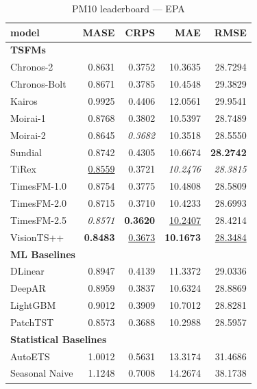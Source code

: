 \begin{table}[H]
\caption{PM10 leaderboard --- EPA}
\centering
\begin{small}
\begin{tabular}{lrrrr}
\toprule
model & MASE & CRPS & MAE & RMSE \\
\midrule
\multicolumn{5}{l}{\textbf{TSFMs}} \\
Chronos-2 & 0.8631 & 0.3752 & 10.3635 & 28.7294 \\
Chronos-Bolt & 0.8671 & 0.3785 & 10.4548 & 29.3829 \\
Kairos & 0.9925 & 0.4406 & 12.0561 & 29.9541 \\
Moirai-1 & 0.8768 & 0.3802 & 10.5397 & 28.7489 \\
Moirai-2 & 0.8645 & \textit{0.3682} & 10.3518 & 28.5550 \\
Sundial & 0.8742 & 0.4305 & 10.6674 & \textbf{28.2742} \\
TiRex & \underline{0.8559} & 0.3721 & \textit{10.2476} & \textit{28.3815} \\
TimesFM-1.0 & 0.8754 & 0.3775 & 10.4808 & 28.5809 \\
TimesFM-2.0 & 0.8715 & 0.3710 & 10.4233 & 28.6993 \\
TimesFM-2.5 & \textit{0.8571} & \textbf{0.3620} & \underline{10.2407} & 28.4214 \\
VisionTS++ & \textbf{0.8483} & \underline{0.3673} & \textbf{10.1673} & \underline{28.3484} \\
\midrule
\multicolumn{5}{l}{\textbf{ML Baselines}} \\
DLinear & 0.8947 & 0.4139 & 11.3372 & 29.0336 \\
DeepAR & 0.8959 & 0.3837 & 10.6324 & 28.8869 \\
LightGBM & 0.9012 & 0.3909 & 10.7012 & 28.8281 \\
PatchTST & 0.8573 & 0.3688 & 10.2988 & 28.5957 \\
\midrule
\multicolumn{5}{l}{\textbf{Statistical Baselines}} \\
AutoETS & 1.0012 & 0.5631 & 13.3174 & 31.4686 \\
Seasonal Naive & 1.1248 & 0.7008 & 14.2674 & 38.1738 \\
\bottomrule
\end{tabular}
\end{small}
\end{table}